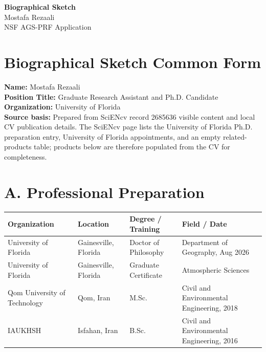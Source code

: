 \documentclass[11pt,letterpaper]{article}
\begin{document}
\begin{center}
{\Large\bfseries Biographical Sketch}\\[0.05in]
{\normalsize Mostafa Rezaali}\\
{\normalsize NSF AGS-PRF Application}
\end{center}
\vspace{-0.08in}
\section*{Biographical Sketch Common Form}
\textbf{Name:} Mostafa Rezaali\\
\textbf{Position Title:} Graduate Research Assistant and Ph.D. Candidate\\
\textbf{Organization:} University of Florida\\
\textbf{Source basis:} Prepared from SciENcv record 2685636 visible content and local CV publication details. The SciENcv page lists the University of Florida Ph.D. preparation entry, University of Florida appointments, and an empty related-products table; products below are therefore populated from the CV for completeness.

\section*{A. Professional Preparation}
\begin{tabularx}{\textwidth}{p{}p{}p{}X}
\toprule
\textbf{Organization} & \textbf{Location} & \textbf{Degree / Training} & \textbf{Field / Date}\\
\midrule
University of Florida & Gainesville, Florida & Doctor of Philosophy & Department of Geography, Aug 2026\\
University of Florida & Gainesville, Florida & Graduate Certificate & Atmospheric Sciences\\
Qom University of Technology & Qom, Iran & M.Sc. & Civil and Environmental Engineering, 2018\\
IAUKHSH & Isfahan, Iran & B.Sc. & Civil and Environmental Engineering, 2016\\
\bottomrule
\end{tabularx}
\end{document}
